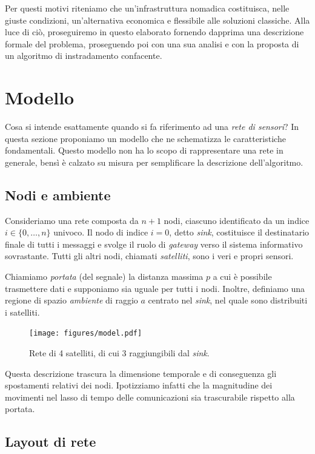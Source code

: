 \documentclass[a4paper,12pt]{article}
\theoremstyle{definition}
\begin{document}
Per questi motivi riteniamo che un'infrastruttura nomadica costituisca, nelle giuste condizioni, un'alternativa economica e flessibile alle soluzioni classiche. Alla luce di ciò, proseguiremo in questo elaborato fornendo dapprima una descrizione formale del problema, proseguendo poi con una sua analisi e con la proposta di un algoritmo di instradamento confacente.

\section{Modello}

Cosa si intende esattamente quando si fa riferimento ad una \emph{rete di sensori}? In questa sezione proponiamo un modello che ne schematizza le caratteristiche fondamentali. Questo modello non ha lo scopo di rappresentare una rete in generale, bensì è calzato su misura per semplificare la descrizione dell'algoritmo.

\subsection{Nodi e ambiente}

Consideriamo una rete composta da $n+1$ nodi, ciascuno identificato da un indice $i \in \{0, \dots, n\}$ univoco. Il nodo di indice $i=0$, detto \emph{sink}, costituisce il destinatario finale di tutti i messaggi e svolge il ruolo di \emph{gateway} verso il sistema informativo sovrastante. Tutti gli altri nodi, chiamati \emph{satelliti}, sono i veri e propri sensori.

Chiamiamo \emph{portata} (del segnale) la distanza massima $p$ a cui è possibile trasmettere dati e supponiamo sia uguale per tutti i nodi. Inoltre, definiamo una regione di spazio \emph{ambiente} di raggio $a$ centrato nel \emph{sink}, nel quale sono distribuiti i satelliti.

\begin{figure}[H]
\centering
\texttt{[image: figures/model.pdf]}
\caption{Rete di 4 satelliti, di cui 3 raggiungibili dal \emph{sink}.}
\end{figure}

Questa descrizione trascura la dimensione temporale e di conseguenza gli spostamenti relativi dei nodi. Ipotizziamo infatti che la magnitudine dei movimenti nel lasso di tempo delle comunicazioni sia trascurabile rispetto alla portata.

\subsection{Layout di rete}
\end{document}
